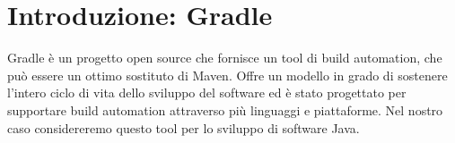 
\section{Introduzione: Gradle} %
Gradle è un progetto open source che fornisce un tool di build automation, che può essere un ottimo sostituto di Maven. Offre un modello in grado di sostenere l'intero ciclo di vita dello sviluppo del software ed è stato progettato per supportare build automation attraverso più linguaggi e piattaforme. Nel nostro caso considereremo questo tool per lo sviluppo di software Java.



